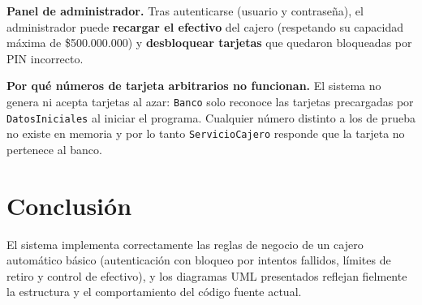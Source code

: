 \documentclass[11pt]{article}
\begin{document}
\textbf{Panel de administrador.} Tras autenticarse (usuario y contraseña), el administrador puede \textbf{recargar el efectivo} del cajero (respetando su capacidad máxima de \$500.000.000) y \textbf{desbloquear tarjetas} que quedaron bloqueadas por PIN incorrecto.

\textbf{Por qué números de tarjeta arbitrarios no funcionan.} El sistema no genera ni acepta tarjetas al azar: \texttt{Banco} solo reconoce las tarjetas precargadas por \texttt{DatosIniciales} al iniciar el programa. Cualquier número distinto a los de prueba no existe en memoria y por lo tanto \texttt{ServicioCajero} responde que la tarjeta no pertenece al banco.

\section{Conclusión}

El sistema implementa correctamente las reglas de negocio de un cajero automático básico (autenticación con bloqueo por intentos fallidos, límites de retiro y control de efectivo), y los diagramas UML presentados reflejan fielmente la estructura y el comportamiento del código fuente actual.
\end{document}
